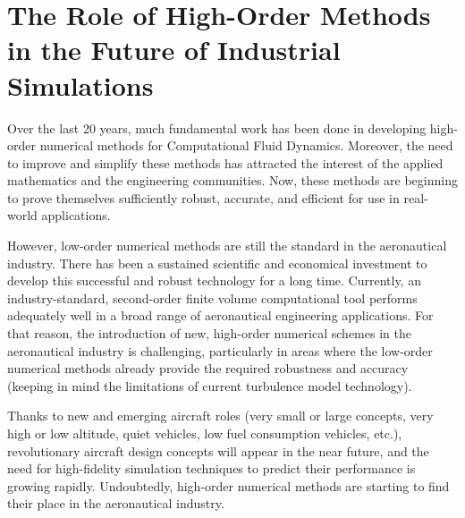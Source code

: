 \section{The Role of High-Order Methods in the Future of Industrial Simulations}

Over the last 20 years, much fundamental work has been done in developing high-order numerical methods for Computational Fluid Dynamics. Moreover, the need to improve and simplify these methods has attracted the interest of the applied mathematics and the engineering communities. Now, these methods are beginning to prove themselves sufficiently robust, accurate, and efficient for use in real-world applications.

However, low-order numerical methods are still the standard in the aeronautical industry. There has been a sustained scientific and economical investment to develop this successful and robust technology for a long time. Currently, an industry-standard, second-order finite volume computational tool performs adequately well in a broad range of aeronautical engineering applications. For that reason, the introduction of new, high-order numerical schemes in the aeronautical industry is challenging, particularly in areas where the low-order numerical methods already provide the required robustness and accuracy (keeping in mind the limitations of current turbulence model technology).

Thanks to new and emerging aircraft roles (very small or large concepts, very high or low altitude, quiet vehicles, low fuel consumption vehicles, etc.), revolutionary aircraft design concepts will appear in the near future, and the need for high-fidelity simulation techniques to predict their performance is growing rapidly. Undoubtedly, high-order numerical methods are starting to find their place in the aeronautical industry. 

